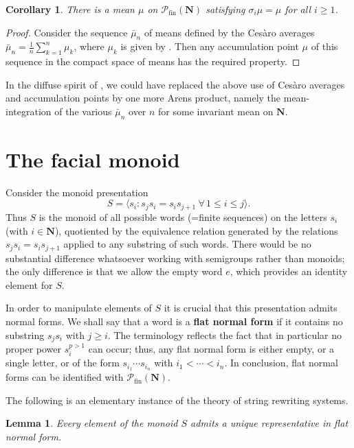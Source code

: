 \documentclass[12pt, pdflatex]{amsart}
\newtheorem{lemma}[theorem]{Lemma}
\newtheorem{corollary}[theorem]{Corollary}
\theoremstyle{definition}
\numberwithin{equation}{section}
\numberwithin{theorem}{section}
\newcommand{\NN}{\mathbf{N}}
\newcommand{\sPf}{\mathscr{P}_\mathrm{fin}}
\begin{document}
\begin{corollary}\label{cor:sigma-invariant}
There is a mean $\mu$ on $\sPf(\NN)$ satisfying $\sigma_i \mu = \mu$ for all $i\geq 1$.
\end{corollary}

\begin{proof}
Consider the sequence $\bar \mu_n$ of means defined by the Ces{\`a}ro averages $\bar \mu_n = \frac1n \sum_{k=1}^n \mu_k$, where $\mu_k$ is given by . Then any accumulation point $\mu$ of this sequence in the compact space of means has the required property.
\end{proof}

In the diffuse spirit of , we could have replaced the above use of Ces{\`a}ro averages and accumulation points by one more Arens product, namely the mean-integration of the various $\bar \mu_n$ over $n$ for some invariant mean on $\NN$.

\section{The facial monoid}\label{sec:facial}
Consider the monoid presentation
\begin{equation*}
S = \big\langle s_i : s_j s_i = s_i s_{j+1} \ \forall\, 1\leq i \leq j  \big\rangle.
\end{equation*}
Thus $S$ is the monoid of all possible words (=finite sequences) on the letters $s_i$ (with $i\in\NN$), quotiented by the equivalence relation generated by the relations $s_j s_i = s_i s_{j+1}$ applied to any substring of such words. There would be no substantial difference whatsoever working with semigroups rather than monoids; the only difference is that we allow the empty word $e$, which provides an identity element for $S$.

In order to manipulate elements of $S$ it is crucial that this presentation admits normal forms. We shall say that a word is a \textbf{flat normal form} if it contains no substring $s_j s_i $ with $j\geq i$. The terminology reflects the fact that in particular no proper power $s_i^{p>1}$ can occur; thus, any flat normal form is either empty, or a single letter, or of the form $s_{i_1} \cdots s_{i_n}$ with $i_1 < \cdots < i_n$. In conclusion, flat normal forms can be identified with $\sPf(\NN)$.

The following is an elementary instance of the theory of string rewriting systems.

\begin{lemma}\label{lem:flat-normal}
Every element of the monoid $S$ admits a unique representative in flat normal form.
\end{lemma}
\end{document}
